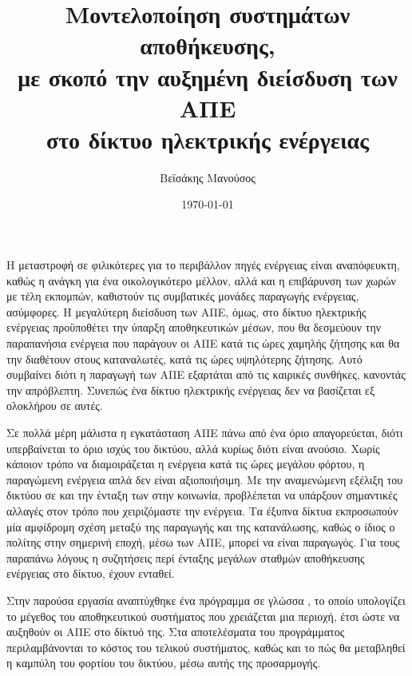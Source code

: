 \documentclass[12pt]{report}
\author{Βεϊσάκης Μανούσος}
\title{Μοντελοποίηση συστημάτων αποθήκευσης, \\με σκοπό την αυξημένη διείσδυση των ΑΠΕ \\στο δίκτυο ηλεκτρικής ενέργειας}
\date{\today}
\begin{document}
\maketitle
\tableofcontents
\chapter*{{}}
Η μεταστροφή σε φιλικότερες για το περιβάλλον πηγές ενέργειας είναι αναπόφευκτη, καθώς η ανάγκη για ένα οικολογικότερο μέλλον, αλλά και η επιβάρυνση των χωρών με τέλη εκπομπών, καθιστούν τις συμβατικές μονάδες παραγωγής ενέργειας,
ασύμφορες. Η μεγαλύτερη διείσδυση των ΑΠΕ, όμως, στο δίκτυο ηλεκτρικής ενέργειας προϋποθέτει την ύπαρξη αποθηκευτικών μέσων, που θα δεσμεύουν την παραπανήσια ενέργεια που παράγουν οι ΑΠΕ κατά τις ώρες
χαμηλής ζήτησης και θα την διαθέτουν στους καταναλωτές, κατά τις ώρες υψηλότερης ζήτησης. 
Αυτό συμβαίνει διότι η παραγωγή των ΑΠΕ εξαρτάται από τις καιρικές συνθήκες, κανοντάς την απρόβλεπτη. Συνεπώς ένα δίκτυο ηλεκτρικής ενέργειας δεν να βασίζεται εξ ολοκλήρου σε αυτές.

Σε πολλά μέρη μάλιστα η εγκατάσταση ΑΠΕ πάνω από ένα όριο απαγορεύεται, διότι υπερβαίνεται το όριο ισχύς του δικτύου, αλλά κυρίως διότι είναι ανούσιο. Χωρίς κάποιον τρόπο να διαμοιράζεται η ενέργεια κατά τις ώρες μεγάλου φόρτου, 
η παραγώμενη ενέργεια απλά δεν είναι αξιοποιήσιμη.
Με την αναμενώμενη εξέλιξη του δικτύου σε {} και την ένταξη των {} στην κοινωνία, προβλέπεται να υπάρξουν σημαντικές αλλαγές στον τρόπο που χειριζόμαστε την ενέργεια. Τα έξυπνα
δίκτυα εκπροσωπούν μία αμφίδρομη σχέση μεταξύ της παραγωγής και της κατανάλωσης, καθώς ο ίδιος ο πολίτης στην σημερινή εποχή, μέσω των ΑΠΕ, μπορεί να είναι παραγωγός. Για τους παραπάνω λόγους η συζητήσεις 
περί ένταξης μεγάλων σταθμών αποθήκευσης ενέργειας στο δίκτυο, έχουν ενταθεί. 

Στην παρούσα εργασία αναπτύχθηκε ένα πρόγραμμα σε γλώσσα {}, το οποίο υπολογίζει το μέγεθος του αποθηκευτικού συστήματος που χρειάζεται μια περιοχή, έτσι ώστε να αυξηθούν οι ΑΠΕ στο δίκτυό της. 
Στα αποτελέσματα του προγράμματος περιλαμβάνονται το κόστος του τελικού συστήματος, καθώς και το πώς θα μεταβληθεί η καμπύλη του φορτίου του δικτύου, μέσω αυτής της προσαρμογής.
\end{document}
